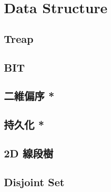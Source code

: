 \documentclass[a4paper,10pt,twocolumn,oneside]{article}
\begin{document}
\section{Data Structure}

\subsection{Treap}


\subsection{BIT}


\subsection{二維偏序 *}


\subsection{持久化 *}


\subsection{2D 線段樹}


% 

% 

% 

\subsection{Disjoint Set}

\end{document}
